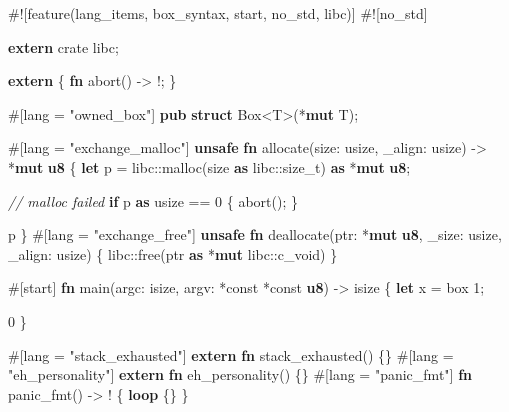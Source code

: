 \documentclass[a4paper,]{book}
\newenvironment{Shaded}{\begin{snugshade}}{\end{snugshade}}
\newcommand{\KeywordTok}[1]{\textcolor[rgb]{0.13,0.29,0.53}{\textbf{{#1}}}}
\newcommand{\DecValTok}[1]{\textcolor[rgb]{0.00,0.00,0.81}{{#1}}}
\newcommand{\StringTok}[1]{\textcolor[rgb]{0.31,0.60,0.02}{{#1}}}
\newcommand{\CommentTok}[1]{\textcolor[rgb]{0.56,0.35,0.01}{\textit{{#1}}}}
\newcommand{\OtherTok}[1]{\textcolor[rgb]{0.56,0.35,0.01}{{#1}}}
\newcommand{\NormalTok}[1]{{#1}}
\begin{document}
\begin{Shaded}
\begin{Highlighting}[]
\NormalTok{#![feature(lang_items, box_syntax, start, no_std, libc)]}
\NormalTok{#![no_std]}

\KeywordTok{extern} \NormalTok{crate libc;}

\KeywordTok{extern} \NormalTok{\{}
    \KeywordTok{fn} \NormalTok{abort() -> !;}
\NormalTok{\}}

\OtherTok{#[}\NormalTok{lang }\OtherTok{=} \StringTok{"owned_box"}\OtherTok{]}
\KeywordTok{pub} \KeywordTok{struct} \NormalTok{Box<T>(*}\KeywordTok{mut} \NormalTok{T);}

\OtherTok{#[}\NormalTok{lang }\OtherTok{=} \StringTok{"exchange_malloc"}\OtherTok{]}
\KeywordTok{unsafe} \KeywordTok{fn} \NormalTok{allocate(size: usize, _align: usize) -> *}\KeywordTok{mut} \KeywordTok{u8} \NormalTok{\{}
    \KeywordTok{let} \NormalTok{p = libc::malloc(size }\KeywordTok{as} \NormalTok{libc::size_t) }\KeywordTok{as} \NormalTok{*}\KeywordTok{mut} \KeywordTok{u8}\NormalTok{;}

    \CommentTok{// malloc failed}
    \KeywordTok{if} \NormalTok{p }\KeywordTok{as} \NormalTok{usize == }\DecValTok{0} \NormalTok{\{}
        \NormalTok{abort();}
    \NormalTok{\}}

    \NormalTok{p}
\NormalTok{\}}
\OtherTok{#[}\NormalTok{lang }\OtherTok{=} \StringTok{"exchange_free"}\OtherTok{]}
\KeywordTok{unsafe} \KeywordTok{fn} \NormalTok{deallocate(ptr: *}\KeywordTok{mut} \KeywordTok{u8}\NormalTok{, _size: usize, _align: usize) \{}
    \NormalTok{libc::free(ptr }\KeywordTok{as} \NormalTok{*}\KeywordTok{mut} \NormalTok{libc::c_void)}
\NormalTok{\}}

\OtherTok{#[}\NormalTok{start}\OtherTok{]}
\KeywordTok{fn} \NormalTok{main(argc: isize, argv: *const *const }\KeywordTok{u8}\NormalTok{) -> isize \{}
    \KeywordTok{let} \NormalTok{x = box }\DecValTok{1}\NormalTok{;}

    \DecValTok{0}
\NormalTok{\}}

\OtherTok{#[}\NormalTok{lang }\OtherTok{=} \StringTok{"stack_exhausted"}\OtherTok{]} \KeywordTok{extern} \KeywordTok{fn} \NormalTok{stack_exhausted() \{\}}
\OtherTok{#[}\NormalTok{lang }\OtherTok{=} \StringTok{"eh_personality"}\OtherTok{]} \KeywordTok{extern} \KeywordTok{fn} \NormalTok{eh_personality() \{\}}
\OtherTok{#[}\NormalTok{lang }\OtherTok{=} \StringTok{"panic_fmt"}\OtherTok{]} \KeywordTok{fn} \NormalTok{panic_fmt() -> ! \{ }\KeywordTok{loop} \NormalTok{\{\} \}}
\end{Highlighting}
\end{Shaded}
\end{document}
